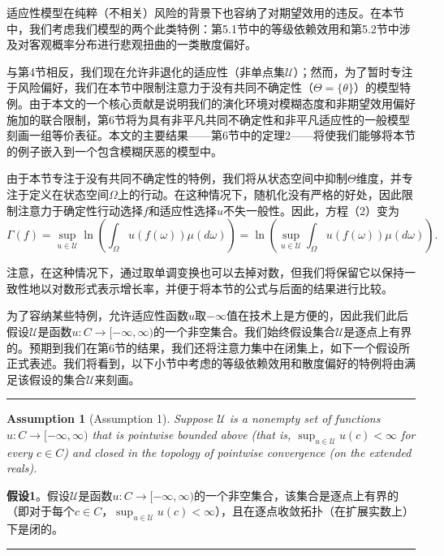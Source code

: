 \documentclass[12pt,a4paper]{article}
\newenvironment{translation}
  {\par\noindent\color{blue!70!black}\smallskip}
  {\par\medskip\hrule\medskip}
\newtheorem{assumption}[theorem]{Assumption}
\begin{document}
\begin{translation}
适应性模型在纯粹（不相关）风险的背景下也容纳了对期望效用的违反。在本节中，我们考虑我们模型的两个此类特例：第5.1节中的等级依赖效用和第5.2节中涉及对客观概率分布进行悲观扭曲的一类散度偏好。

与第4节相反，我们现在允许非退化的适应性（非单点集$\mathcal{U}$）；然而，为了暂时专注于风险偏好，我们在本节中限制注意力于没有共同不确定性（$\Theta = \{\theta\}$）的模型特例。由于本文的一个核心贡献是说明我们的演化环境对模糊态度和非期望效用偏好施加的联合限制，第6节将为具有非平凡共同不确定性和非平凡适应性的一般模型刻画一组等价表征。本文的主要结果——第6节中的定理2——将使我们能够将本节的例子嵌入到一个包含模糊厌恶的模型中。

由于本节专注于没有共同不确定性的特例，我们将从状态空间中抑制$\Theta$维度，并专注于定义在状态空间$\Omega$上的行动。在这种情况下，随机化没有严格的好处，因此限制注意力于确定性行动选择$f$和适应性选择$u$不失一般性。因此，方程（2）变为
\[
\Gamma(f) = \sup_{u \in \mathcal{U}} \ln\left( \int_\Omega u(f(\omega)) \mu(d\omega) \right)
= \ln\left( \sup_{u \in \mathcal{U}} \int_\Omega u(f(\omega)) \mu(d\omega) \right).
\]

注意，在这种情况下，通过取单调变换也可以去掉对数，但我们将保留它以保持一致性地以对数形式表示增长率，并便于将本节的公式与后面的结果进行比较。

为了容纳某些特例，允许适应性函数$u$取$-\infty$值在技术上是方便的，因此我们此后假设$\mathcal{U}$是函数$u: C \to [-\infty, \infty)$的一个非空集合。我们始终假设集合$\mathcal{U}$是逐点上有界的。预期到我们在第6节的结果，我们还将注意力集中在闭集上，如下一个假设所正式表述。我们将看到，以下小节中考虑的等级依赖效用和散度偏好的特例将由满足该假设的集合$\mathcal{U}$来刻画。
\end{translation}

\begin{assumption}[Assumption 1]
Suppose $\mathcal{U}$ is a nonempty set of functions $u: C \to [-\infty, \infty)$ that is pointwise bounded above (that is, $\sup_{u \in \mathcal{U}} u(c) < \infty$ for every $c \in C$) and closed in the topology of pointwise convergence (on the extended reals).
\end{assumption}
\begin{translation}
\textbf{假设1}。假设$\mathcal{U}$是函数$u: C \to [-\infty, \infty)$的一个非空集合，该集合是逐点上有界的（即对于每个$c \in C$，$\sup_{u \in \mathcal{U}} u(c) < \infty$），且在逐点收敛拓扑（在扩展实数上）下是闭的。
\end{translation}
\end{document}
